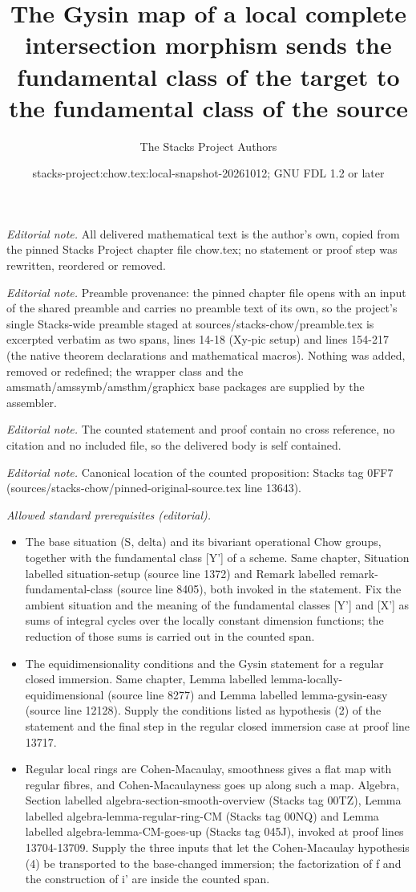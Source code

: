 \documentclass[10pt,a4paper]{amsart}
\title{The Gysin map of a local complete intersection morphism sends the fundamental class of the target to the fundamental class of the source}
\author{The Stacks Project Authors}
\date{stacks-project:chow.tex:local-snapshot-20261012; GNU FDL 1.2 or later}
\theoremstyle{plain}
\theoremstyle{definition}
\theoremstyle{remark}
\numberwithin{equation}{subsection}
\begin{document}
\maketitle
\noindent\textit{Editorial note.} All delivered mathematical text is the author's own, copied from the pinned Stacks Project chapter file chow.tex; no statement or proof step was rewritten, reordered or removed.\par\medskip
\noindent\textit{Editorial note.} Preamble provenance: the pinned chapter file opens with an input of the shared preamble and carries no preamble text of its own, so the project's single Stacks-wide preamble staged at sources/stacks-chow/preamble.tex is excerpted verbatim as two spans, lines 14-18 (Xy-pic setup) and lines 154-217 (the native theorem declarations and mathematical macros). Nothing was added, removed or redefined; the wrapper class and the amsmath/amssymb/amsthm/graphicx base packages are supplied by the assembler.\par\medskip
\noindent\textit{Editorial note.} The counted statement and proof contain no cross reference, no citation and no included file, so the delivered body is self contained.\par\medskip
\noindent\textit{Editorial note.} Canonical location of the counted proposition: Stacks tag 0FF7 (sources/stacks-chow/pinned-original-source.tex line 13643).\par\medskip
\noindent\textit{Allowed standard prerequisites (editorial).}\begin{itemize}
\item The base situation (S, delta) and its bivariant operational Chow groups, together with the fundamental class [Y'] of a scheme. Same chapter, Situation labelled situation-setup (source line 1372) and Remark labelled remark-fundamental-class (source line 8405), both invoked in the statement. Fix the ambient situation and the meaning of the fundamental classes [Y'] and [X'] as sums of integral cycles over the locally constant dimension functions; the reduction of those sums is carried out in the counted span.
\item The equidimensionality conditions and the Gysin statement for a regular closed immersion. Same chapter, Lemma labelled lemma-locally-equidimensional (source line 8277) and Lemma labelled lemma-gysin-easy (source line 12128). Supply the conditions listed as hypothesis (2) of the statement and the final step in the regular closed immersion case at proof line 13717.
\item Regular local rings are Cohen-Macaulay, smoothness gives a flat map with regular fibres, and Cohen-Macaulayness goes up along such a map. Algebra, Section labelled algebra-section-smooth-overview (Stacks tag 00TZ), Lemma labelled algebra-lemma-regular-ring-CM (Stacks tag 00NQ) and Lemma labelled algebra-lemma-CM-goes-up (Stacks tag 045J), invoked at proof lines 13704-13709. Supply the three inputs that let the Cohen-Macaulay hypothesis (4) be transported to the base-changed immersion; the factorization of f and the construction of i' are inside the counted span.
\end{itemize}\medskip
\end{document}
